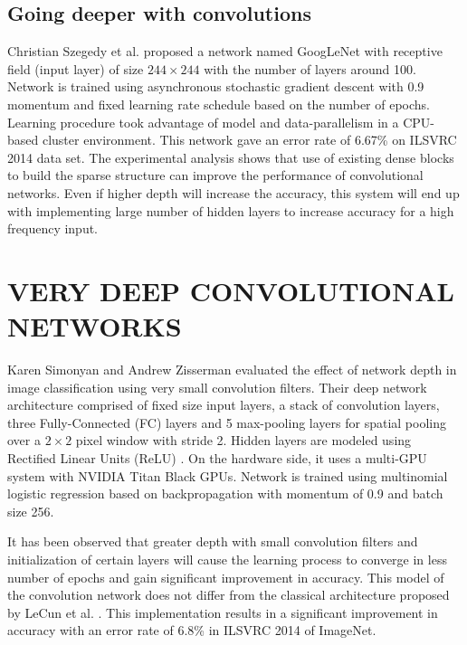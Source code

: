 \documentclass{article}
\begin{document}
\subsection{Going deeper with convolutions }
Christian Szegedy et al. \cite{Szegedy} proposed a network named GoogLeNet with receptive field (input layer) of size $244\times244$ with the number of layers around 100. Network is trained using asynchronous stochastic gradient descent with 0.9 momentum and fixed learning rate schedule based on the number of epochs. Learning procedure took advantage of  model and data-parallelism in a CPU-based cluster environment. This network gave an error rate of  6.67\%  on  ILSVRC 2014 data set. The experimental analysis shows that use of existing dense  blocks to  build the sparse structure can improve the  performance of convolutional networks. Even if higher depth will increase the accuracy, this system will end up with implementing large number of hidden layers to increase accuracy for a high frequency input. 


\section{VERY DEEP CONVOLUTIONAL NETWORKS }
Karen Simonyan and Andrew Zisserman \cite{Arge2015} evaluated the effect of network depth in image classification using very small convolution filters. Their deep network architecture comprised of fixed  size input layers, a stack of convolution layers, three Fully-Connected (FC) layers and  5 max-pooling layers for spatial pooling  over a $2 \times 2$ pixel window with stride 2. Hidden layers are modeled using Rectified Linear Units (ReLU) \cite{Nair2010}. On the hardware side, it uses a multi-GPU system with NVIDIA Titan Black GPUs. Network is trained using multinomial logistic regression  based on backpropagation with momentum of 0.9 and  batch size  256.
\par
It has been observed that greater depth with small convolution filters and  initialization of certain layers will cause the learning process to converge in less number of epochs and gain significant improvement in accuracy. This model of the convolution network does not differ from the classical architecture proposed by LeCun et al. \cite{LeCun1998}. This implementation results in a significant improvement in accuracy with  an error rate of 6.8\% in ILSVRC 2014 of ImageNet.
\end{document}
